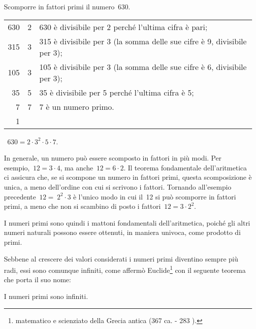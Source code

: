 \begin{exrig}
 \begin{esempio}
 Scomporre in fattori primi il numero~630.
 \begin{center}
% 
 \begin{tabular}{r|l@{\hspace{15mm}}l}
 	630 & 2 & 630 è divisibile per 2 perché l'ultima cifra è pari;\\
	315 & 3 & 315 è divisibile per 3 (la somma delle sue cifre è 9, divisibile per 3);\\
	105 & 3 & 105 è divisibile per 3 (la somma delle sue cifre è 6, divisibile per 3);\\
	35 & 5 & 35 è divisibile per 5 perché l'ultima cifra è 5;\\
	7 & 7 & 7 è un numero primo.\\
	1 & \\
 \end{tabular}
 ~$630=2\cdot3^2\cdot5\cdot7.$
 \end{center}
 \end{esempio}
\end{exrig}

In generale, un numero può essere scomposto in fattori in più modi. Per esempio,~$12=3\cdot 4$,
ma anche~$12=6\cdot2$. Il teorema fondamentale dell'aritmetica ci assicura che, se si scompone un numero in fattori primi,
questa scomposizione è unica, a meno dell'ordine con cui si scrivono i fattori. Tornando all'esempio
precedente~$12=~2^2\cdot 3$ è l'unico modo in cui il~12 si può scomporre in fattori primi, a meno che non si
scambino di posto i fattori~$12=3\cdot 2^2$.

I numeri primi sono quindi i mattoni fondamentali dell'aritmetica, poiché gli altri numeri naturali possono essere ottenuti, in maniera univoca, come prodotto di primi.

Sebbene al crescere dei valori considerati i numeri primi diventino sempre più radi, essi sono comunque infiniti, come affermò Euclide\footnote{matematico e scienziato della Grecia antica (367 \aC{} ca. - 283 \aC).} con il seguente teorema che porta il suo nome:
\begin{teorema}[di Euclide]
I numeri primi sono infiniti.
\end{teorema}

